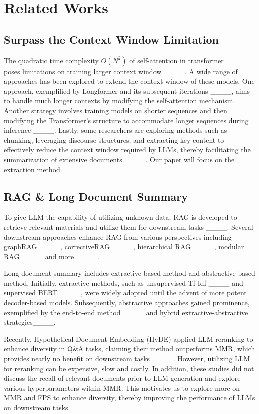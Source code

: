 \section{Related Works}
\subsection{Surpass the Context Window Limitation}
The quadratic time complexity \(O(N^{2})\) of self-attention in transformer ____ poses limitations on training larger context window ____. A wide range of approaches has been explored to extend the context window of these models. One approach, exemplified by Longformer and its subsequent iterations ____, aims to handle much longer contexts by modifying the self-attention mechanism. Another strategy involves training models on shorter sequences and then modifying the Transformer's structure to accommodate longer sequences during inference ____. Lastly, some researchers are exploring methods such as chunking, leveraging discourse structures, and extracting key content to effectively reduce the context window required by LLMs, thereby facilitating the summarization of extensive documents ____. Our paper will focus on the extraction method.

\subsection{RAG \& Long Document Summary}
To give LLM the capability of utilizing unknown data, RAG is developed to retrieve relevant materials and utilize them for downstream tasks ____. Several downstream approaches enhance RAG from various perspectives including graphRAG ____, correctiveRAG ____, hierarchical RAG ____, modular RAG ____ and more ____.

Long document summary includes extractive based method and abstractive based method. Initially, extractive methods, such as unsupervised Tf-Idf ____ and supervised BERT ____, were widely adopted until the advent of more potent decoder-based models. Subsequently, abstractive approaches gained prominence, exemplified by the end-to-end method ____ and hybrid extractive-abstractive strategies____.

Recently, Hypothetical Document Embedding (HyDE) applied LLM reranking to enhance diversity in Q\&A tasks, claiming their method outperforms MMR, which provides nearly no benefit on downstream tasks ____. However, utilizing LLM for reranking can be expensive, slow and costly. In addition, these studies did not discuss the recall of relevant documents prior to LLM generation and explore various hyperparameters within MMR. This motivates us to explore more on MMR and FPS to enhance diversity, thereby improving the performance of LLMs on downstream tasks.

